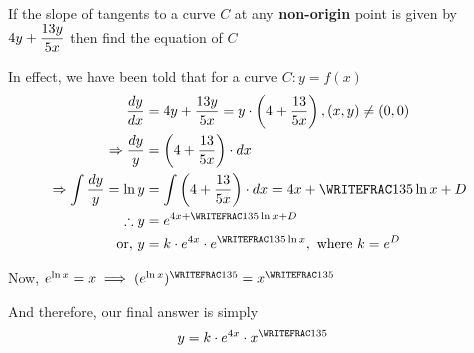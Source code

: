 

\question[3] If the slope of tangents to a curve $C$ at any \textbf{non-origin} point is given by 
$4 y + \dfrac{13 y}{5 x}$ then find the equation of $C$


\watchout

\ifprintanswers
\fi 

\begin{solution}[\halfpage]
  In effect, we have been told that for a curve $C: y = f(x)$ 
  \begin{align}
    \dfrac{dy}{dx} &= \vbone y + \dfrac{\vbtwo y}{\vbthree x} 
    = y\cdot\left(\vbone + \dfrac{\vbtwo}{\vbthree x} \right), (x,y)\neq(0,0) \\
    \Rightarrow \dfrac{dy}{y} &= \left(\vbone + \dfrac{\vbtwo}{\vbthree x}\right)\cdot dx \\
    \Rightarrow\int\dfrac{dy}{y} = \ln y &= \int \left(\vbone + \dfrac{\vbtwo}{\vbthree x}\right)\cdot dx =  \vbone x + \WRITEFRAC\vbtwo\vbthree\ln x + D \\
    \therefore y &= e^{\vbone x + \WRITEFRAC\vbtwo\vbthree\ln x + D} \\
    \text{or, } y &= k\cdot e^{\vbone x}\cdot e^{\WRITEFRAC\vbtwo\vbthree\ln x}, \text{ where } k = e^D
  \end{align}
  
  Now, $e^{\ln x} = x \implies (e^{\ln x})^{\WRITEFRAC\vbtwo\vbthree} = x^{\WRITEFRAC\vbtwo\vbthree}$
  
  And therefore, our final answer is simply
  \begin{align}
    y &= k\cdot e^{\vbone x}\cdot x^{\WRITEFRAC\vbtwo\vbthree}
  \end{align}
\end{solution}

\ifprintrubric
\fi
